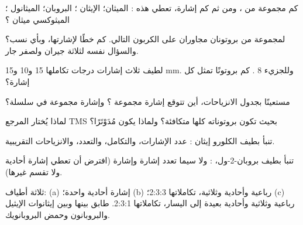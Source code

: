 \begin{exercise}[$\star$]\label{exo:g12:proton-nmr:1}
كم مجموعة من ، ومن ثم كم إشارة، تعطي هذه
: الميثان؛ الإيثان ؛ البروبان؛ الميثانول
؛ الميثوكسي ميثان ؟
\end{exercise}

\begin{exercise}[$\star$]\label{exo:g12:proton-nmr:2}
لمجموعة من  بروتونان مجاوران على الكربون التالي. كم
خطًا لإشارتها، وبأي نسب؟ والسؤال نفسه لثلاثة جيران
ولصفر جار.
\end{exercise}

\begin{exercise}[$\star$]\label{exo:g12:proton-nmr:3}
لطيف ثلاث إشارات درجات تكاملها 15 و10
و15 mm. وللجزيء 8 . كم بروتونًا تمثل كل
إشارة؟
\end{exercise}

\begin{exercise}[$\star$]\label{exo:g12:proton-nmr:4}
مستعينًا بجدول الانزياحات، أين تتوقع إشارة 
مجموعة ؟ وإشارة مجموعة  في سلسلة؟
\end{exercise}

\begin{exercise}[$\star$]\label{exo:g12:proton-nmr:5}
لماذا يُختار المرجع TMS بحيث تكون بروتوناته كلها متكافئة؟
ولماذا يكون  مُدَوْتَرًا؟
\end{exercise}

\begin{exercise}[$\star\star$]\label{exo:g12:proton-nmr:6}
تنبأ بطيف الكلورو إيثان : عدد الإشارات،
والتكامل، والتعدد، والانزياحات التقريبية.
\end{exercise}

\begin{exercise}[$\star\star$]\label{exo:g12:proton-nmr:7}
تنبأ بطيف بروبان-2-ول، : ولا سيما
تعدد إشارة  وإشارة  (افترض أن
 تعطي إشارة أحادية ولا تقسم غيرها).
\end{exercise}

\begin{exercise}[$\star\star$]\label{exo:g12:proton-nmr:8}
ثلاثة أطياف: (a) إشارة أحادية واحدة؛ (b) رباعية وأحادية وثلاثية،
تكاملاتها 2:3:3؛ (c) رباعية وثلاثية وأحادية بعيدة إلى اليسار،
تكاملاتها 2:3:1. طابق بينها وبين إيثانوات الإيثيل والبروبانون
وحمض البروبانويك.
\end{exercise}

